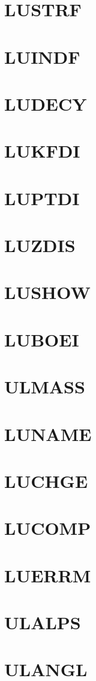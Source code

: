\documentclass[14pt,UTF8]{ctexbook}
\begin{document}
\section{LUSTRF}
\section{LUINDF}
\section{LUDECY}
\section{LUKFDI}
\section{LUPTDI}
\section{LUZDIS}
\section{LUSHOW}
\section{LUBOEI}
\section{ULMASS}
\section{LUNAME}
\section{LUCHGE}
\section{LUCOMP}
\section{LUERRM}
\section{ULALPS}
\section{ULANGL}
\end{document}
